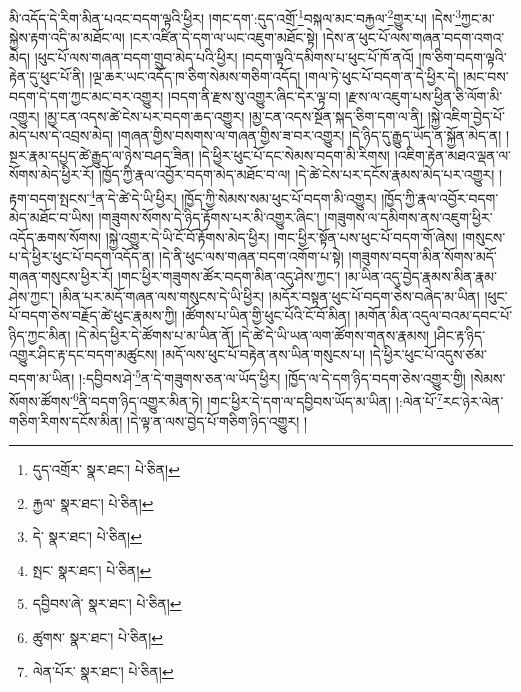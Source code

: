 མི་འདོད་དེ་རིག་མིན་པའང་བདག་ལྟའི་ཕྱིར། །གང་དག་:དུད་འགྲོ་\footnote{དུད་འགྲོར་  སྣར་ཐང་།  པེ་ཅིན། }བསྐལ་མང་བརྐྱལ་\footnote{རྐྱལ་  སྣར་ཐང་།  པེ་ཅིན། }གྱུར་པ། །དེས་\footnote{དེ་  སྣར་ཐང་།  པེ་ཅིན། }ཀྱང་མ་སྐྱེས་རྟག་འདི་མ་མཐོང་ལ། །ངར་འཛིན་དེ་དག་ལ་ཡང་འཇུག་མཐོང་སྟེ། །དེས་ན་ཕུང་པོ་ལས་གཞན་བདག་འགའ་མེད། །ཕུང་པོ་ལས་གཞན་བདག་གྲུབ་མེད་པའི་ཕྱིར། །བདག་ལྟའི་དམིགས་པ་ཕུང་པོ་ཁོ་ནའོ། །ཁ་ཅིག་བདག་ལྟའི་རྟེན་དུ་ཕུང་པོ་ནི། །ལྔ་ཆར་ཡང་འདོད་ཁ་ཅིག་སེམས་གཅིག་འདོད། །གལ་ཏེ་ཕུང་པོ་བདག་ན་དེ་ཕྱིར་དེ། །མང་བས་བདག་དེ་དག་ཀྱང་མང་བར་འགྱུར། །བདག་ནི་རྫས་སུ་འགྱུར་ཞིང་དེར་ལྟ་བ། །རྫས་ལ་འཇུག་པས་ཕྱིན་ཅི་ལོག་མི་འགྱུར། །མྱ་ངན་འདས་ཚེ་ངེས་པར་བདག་ཆད་འགྱུར། །མྱ་ངན་འདས་སྔོན་སྐད་ཅིག་དག་ལ་ནི། །སྐྱེ་འཇིག་བྱེད་པོ་མེད་པས་དེ་འབྲས་མེད། །གཞན་གྱིས་བསགས་ལ་གཞན་གྱིས་ཟ་བར་འགྱུར། །དེ་ཉིད་དུ་རྒྱུད་ཡོད་ན་སྐྱོན་མེད་ན། །སྔར་རྣམ་དཔྱད་ཚེ་རྒྱུད་ལ་ཉེས་བཤད་ཟིན། །དེ་ཕྱིར་ཕུང་པོ་དང་སེམས་བདག་མི་རིགས། །འཇིག་རྟེན་མཐའ་ལྡན་ལ་སོགས་མེད་ཕྱིར་རོ། །ཁྱོད་ཀྱི་རྣལ་འབྱོར་བདག་མེད་མཐོང་བ་ལ། །དེ་ཚེ་ངེས་པར་དངོས་རྣམས་མེད་པར་འགྱུར། །རྟག་བདག་སྤངས་\footnote{སྤང་  སྣར་ཐང་།  པེ་ཅིན། }ན་དེ་ཚེ་དེ་ཡི་ཕྱིར། །ཁྱོད་ཀྱི་སེམས་སམ་ཕུང་པོ་བདག་མི་འགྱུར། །ཁྱོད་ཀྱི་རྣལ་འབྱོར་བདག་མེད་མཐོང་བ་ཡིས། །གཟུགས་སོགས་དེ་ཉིད་རྟོགས་པར་མི་འགྱུར་ཞིང་། །གཟུགས་ལ་དམིགས་ནས་འཇུག་ཕྱིར་འདོད་ཆགས་སོགས། །སྐྱེ་འགྱུར་དེ་ཡི་ངོ་བོ་རྟོགས་མེད་ཕྱིར། །གང་ཕྱིར་སྟོན་པས་ཕུང་པོ་བདག་གོ་ཞེས། །གསུངས་པ་དེ་ཕྱིར་ཕུང་པོ་བདག་འདོད་ན། །དེ་ནི་ཕུང་ལས་གཞན་བདག་འགོག་པ་སྟེ། །གཟུགས་བདག་མིན་སོགས་མདོ་གཞན་གསུངས་ཕྱིར་རོ། །གང་ཕྱིར་གཟུགས་ཚོར་བདག་མིན་འདུ་ཤེས་ཀྱང་། །མ་ཡིན་འདུ་བྱེད་རྣམས་མིན་རྣམ་ཤེས་ཀྱང་། །མིན་པར་མདོ་གཞན་ལས་གསུངས་དེ་ཡི་ཕྱིར། །མདོར་བསྟན་ཕུང་པོ་བདག་ཅེས་བཞེད་མ་ཡིན། །ཕུང་པོ་བདག་ཅེས་བརྗོད་ཚེ་ཕུང་རྣམས་ཀྱི། །ཚོགས་པ་ཡིན་གྱི་ཕུང་པོའི་ངོ་བོ་མིན། །མགོན་མིན་འདུལ་བའམ་དབང་པོ་ཉིད་ཀྱང་མིན། །དེ་མེད་ཕྱིར་དེ་ཚོགས་པ་མ་ཡིན་ནོ། །དེ་ཚེ་དེ་ཡི་ཡན་ལག་ཚོགས་གནས་རྣམས། །ཤིང་རྟ་ཉིད་འགྱུར་ཤིང་རྟ་དང་བདག་མཚུངས། །མདོ་ལས་ཕུང་པོ་བརྟེན་ནས་ཡིན་གསུངས་པ། །དེ་ཕྱིར་ཕུང་པོ་འདུས་ཙམ་བདག་མ་ཡིན། །:དབྱིབས་ཤེ་\footnote{དབྱིབས་ཞེ་  སྣར་ཐང་།  པེ་ཅིན། }ན་དེ་གཟུགས་ཅན་ལ་ཡོད་ཕྱིར། །ཁྱོད་ལ་དེ་དག་ཉིད་བདག་ཅེས་འགྱུར་གྱི། །སེམས་སོགས་ཚོགས་\footnote{ཚུགས་  སྣར་ཐང་།  པེ་ཅིན། }ནི་བདག་ཉིད་འགྱུར་མིན་ཏེ། །གང་ཕྱིར་དེ་དག་ལ་དབྱིབས་ཡོད་མ་ཡིན། །:ལེན་པོ་\footnote{ལེན་པོར་  སྣར་ཐང་།  པེ་ཅིན། }རང་ཉེར་ལེན་གཅིག་རིགས་དངོས་མིན། །དེ་ལྟ་ན་ལས་བྱེད་པོ་གཅིག་ཉིད་འགྱུར། །
